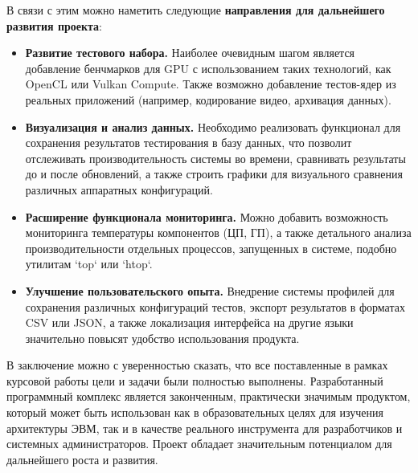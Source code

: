В связи с этим можно наметить следующие \textbf{направления для дальнейшего развития проекта}:
\begin{itemize}
    \item \textbf{Развитие тестового набора.} Наиболее очевидным шагом является добавление бенчмарков для GPU с использованием таких технологий, как OpenCL или Vulkan Compute. Также возможно добавление тестов-ядер из реальных приложений (например, кодирование видео, архивация данных).

    \item \textbf{Визуализация и анализ данных.} Необходимо реализовать функционал для сохранения результатов тестирования в базу данных, что позволит отслеживать производительность системы во времени, сравнивать результаты до и после обновлений, а также строить графики для визуального сравнения различных аппаратных конфигураций.

    \item \textbf{Расширение функционала мониторинга.} Можно добавить возможность мониторинга температуры компонентов (ЦП, ГП), а также детального анализа производительности отдельных процессов, запущенных в системе, подобно утилитам `top` или `htop`.

    \item \textbf{Улучшение пользовательского опыта.} Внедрение системы профилей для сохранения различных конфигураций тестов, экспорт результатов в форматах CSV или JSON, а также локализация интерфейса на другие языки значительно повысят удобство использования продукта.
\end{itemize}

В заключение можно с уверенностью сказать, что все поставленные в рамках курсовой работы цели и задачи были полностью выполнены. Разработанный программный комплекс является законченным, практически значимым продуктом, который может быть использован как в образовательных целях для изучения архитектуры ЭВМ, так и в качестве реального инструмента для разработчиков и системных администраторов. Проект обладает значительным потенциалом для дальнейшего роста и развития.

